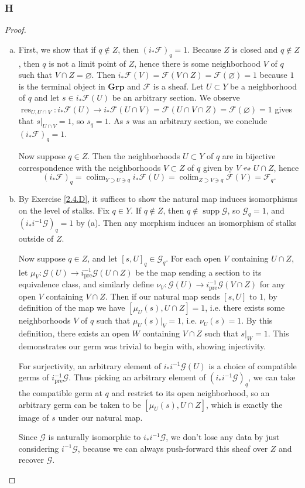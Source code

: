\documentclass{article}
\newcommand{\fF}{\mathscr{F}}
\newcommand{\fG}{\mathscr{G}}
\DeclareMathOperator{\pre}{pre}
\DeclareMathOperator{\res}{res}
\DeclareMathOperator{\colim}{colim}
\DeclareMathOperator{\supp}{supp}
\newcommand{\Grp}{\mathbf{Grp}} %
\let\emptyset\varnothing
\begin{document}
\subsubsection{H}\label{2.7.H}
\begin{proof}
    \begin{enumerate}[(a)]
        \item First, we show that if $q\notin Z$, then $(i_* \fF)_q = 1$. Because $Z$ is closed and $q\notin Z$, then $q$ is not a limit point of $Z$, hence there is some neighborhood $V$ of $q$ such that $V\cap Z = \emptyset$. Then $i_*\fF(V) = \fF(V\cap Z)=\fF(\emptyset)=1$ because $1$ is the terminal object in $\Grp$ and $\fF$ is a sheaf. Let $U\subset Y$ be a neighborhood of $q$ and let $s\in i_*\fF(U)$ be an arbitrary section. We observe $\res_{U,U\cap V}:i_* \fF(U) \to i_*\fF(U\cap V)= \fF(U\cap V \cap Z)=\fF(\emptyset)=1$ gives that $s\vert_{U\cap V}=1$, so $s_q=1$. As $s$ was an arbitrary section, we conclude $(i_* \fF)_q =1$.
        
        Now suppose $q\in Z$. Then the neighborhoods $U\subset Y$ of $q$ are in bijective correspondence with the neighborhoods $V\subset Z$ of $q$ given by $V\leftrightsquigarrow U\cap Z$, hence
        \[
        (i_* \fF)_q = \colim_{Y\supset U\ni q} i_* \fF(U) = \colim_{Z\supset V \ni q} \fF(V) =\fF_q.
        \]
         \item By Exercise \ref{2.4.D}, it suffices to show the natural map induces isomorphisms on the level of stalks. Fix $q\in Y$. If $q\notin Z$, then $q\notin \supp \fG$, so $\fG_q=1$, and $(i_*i^{-1} \fG)_q =1$ by (a). Then any morphism induces an isomorphism of stalks outside of $Z$.

         Now suppose $q\in Z$, and let $[s,U]_q \in \fG_q$. For each open $V$ containing $U\cap Z$, let $\mu_V:\fG(U)\to i^{-1}_{\pre}\fG (U\cap Z)$ be the map sending a section to its equivalence class, and similarly define $\nu_V:\fG(U)\to i^{-1}_{\pre} \fG(V\cap Z)$ for any open $V$ containing $V\cap Z$. Then if our natural map sends $[s,U]$ to $1$, by definition of the map we have $[\mu_U(s),U\cap Z]=1$, i.e. there exists some neighborhoods $V$ of $q$ such that $\mu_U(s)\vert_V =1$, i.e. $\nu_U(s)=1$. By this definition, there exists an open $W$ containing $V\cap Z$ such that $s\vert_W=1$. This demonstrates our germ was trivial to begin with, showing injectivity.

         For surjectivity, an arbitrary element of $i_* i^{-1} \fG(U)$ is a choice of compatible germs of $i^{-1}_{\pre} \fG$. Thus picking an arbitrary element of $(i_* i^{-1} \fG)_q$, we can take the compatible germ at $q$ and restrict to its open neighborhood, so an arbitrary germ can be taken to be $[\mu_U(s),U\cap Z]$, which is exactly the image of $s$ under our natural map.

         Since $\fG$ is naturally isomorphic to $i_* i^{-1} \fG$, we don't lose any data by just considering $i^{-1} \fG$, because we can always push-forward this sheaf over $Z$ and recover $\fG$.
    \end{enumerate}
   
\end{proof}
\printbibliography
\end{document}
